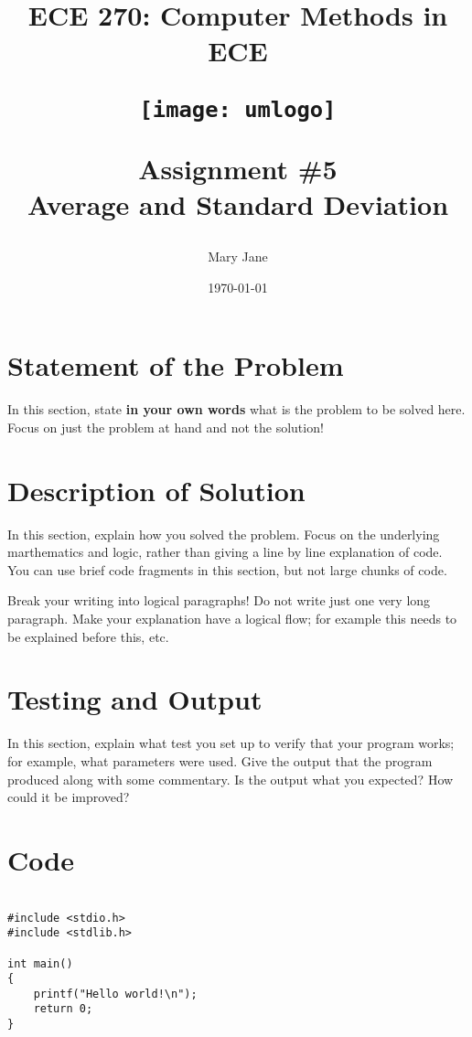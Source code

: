 \documentclass[letterpaper, 24pt, final, onecolumn, titlepage] {article}
\title{ECE 270: Computer Methods in ECE \\
	\vspace{1.5cm}
   		\begin{center}\texttt{[image: umlogo]} \end{center}
	\vspace{1.5cm}
	\textbf{Assignment \#5} \\
	Average and Standard Deviation}
\author{Mary Jane}
\date{\today}
\begin{document}
\maketitle

\doublespacing

\section{Statement of the Problem}

In this section, state \textbf{in your own words} what is the problem to be solved here. Focus on just the problem at hand and not the solution!

\section{Description of Solution}

In this section, explain how you solved the problem. Focus on the underlying marthematics and logic, rather than giving a line by line explanation of code. You can use brief code fragments in this section, but not large chunks of code. 

Break your writing into logical paragraphs! Do not write just one very long paragraph. Make your explanation have a logical flow; for example this needs to be explained before this, etc.

\section{Testing and Output}

In this section, explain what test you set up to verify that your program works; for example, what parameters were used. Give the output that the program produced along with some commentary. Is the output what you expected? How could it be improved?

\pagebreak

\section{Code}
\singlespacing

\begin{lstlisting}

#include <stdio.h>
#include <stdlib.h>

int main()
{
    printf("Hello world!\n");
    return 0;
}

\end{lstlisting}
\end{document}
